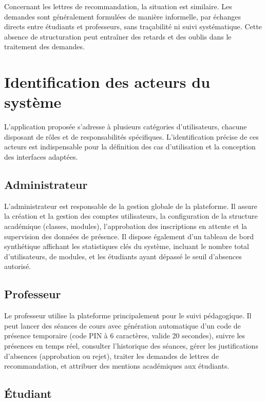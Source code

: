 \documentclass[12pt, a4paper, openright]{report}
\begin{document}
Concernant les lettres de recommandation, la situation est similaire. Les demandes sont généralement formulées de manière informelle, par échanges directs entre étudiants et professeurs, sans traçabilité ni suivi systématique. Cette absence de structuration peut entraîner des retards et des oublis dans le traitement des demandes.

\section{Identification des acteurs du système}

L'application proposée s'adresse à plusieurs catégories d'utilisateurs, chacune disposant de rôles et de responsabilités spécifiques. L'identification précise de ces acteurs est indispensable pour la définition des cas d'utilisation et la conception des interfaces adaptées.

\subsection{Administrateur}

L'administrateur est responsable de la gestion globale de la plateforme. Il assure la création et la gestion des comptes utilisateurs, la configuration de la structure académique (classes, modules), l'approbation des inscriptions en attente et la supervision des données de présence. Il dispose également d'un tableau de bord synthétique affichant les statistiques clés du système, incluant le nombre total d'utilisateurs, de modules, et les étudiants ayant dépassé le seuil d'absences autorisé.

\subsection{Professeur}

Le professeur utilise la plateforme principalement pour le suivi pédagogique. Il peut lancer des séances de cours avec génération automatique d'un code de présence temporaire (code PIN à 6 caractères, valide 20 secondes), suivre les présences en temps réel, consulter l'historique des séances, gérer les justifications d'absences (approbation ou rejet), traiter les demandes de lettres de recommandation, et attribuer des mentions académiques aux étudiants.

\subsection{Étudiant}
\end{document}

